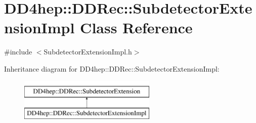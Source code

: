 \hypertarget{class_d_d4hep_1_1_d_d_rec_1_1_subdetector_extension_impl}{}\section{D\+D4hep\+:\+:D\+D\+Rec\+:\+:Subdetector\+Extension\+Impl Class Reference}
\label{class_d_d4hep_1_1_d_d_rec_1_1_subdetector_extension_impl}


{\ttfamily \#include $<$Subdetector\+Extension\+Impl.\+h$>$}

Inheritance diagram for D\+D4hep\+:\+:D\+D\+Rec\+:\+:Subdetector\+Extension\+Impl\+:\begin{figure}[H]
\begin{center}
\leavevmode
\includegraphics[height=2.000000cm]{class_d_d4hep_1_1_d_d_rec_1_1_subdetector_extension_impl}
\end{center}
\end{figure}
